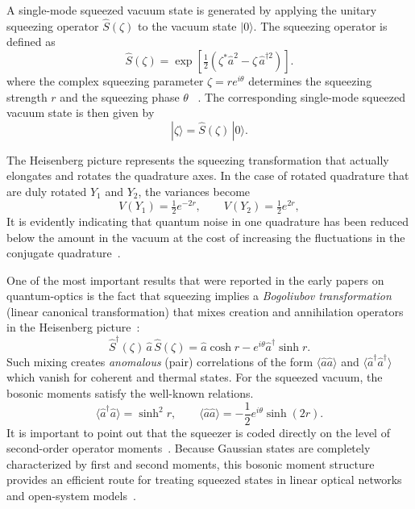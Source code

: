 A single-mode squeezed vacuum state is generated by applying the unitary
squeezing operator $\hat{S}(\zeta)$ to the vacuum state $|0\rangle$.
The squeezing operator is defined as
\begin{equation}
	\hat{S}(\zeta)
	= \exp\!\left[\tfrac{1}{2}\left(\zeta^{*}\hat{a}^{2}
	- \zeta\,\hat{a}^{\dagger 2}\right)\right].
\end{equation}
where the complex squeezing parameter $\zeta = r e^{i\theta}$ determines
the squeezing strength $r$ and the squeezing phase $\theta$
~\cite{Walls1983,AdessoRagyLee2014,WallsMilburn,Weedbrook2012}.
The corresponding single-mode squeezed vacuum state is then given by
\begin{equation}
	|\zeta\rangle = \hat{S}(\zeta)\,|0\rangle .
\end{equation}

The Heisenberg picture represents the squeezing transformation that actually elongates and rotates the quadrature axes. In the case of rotated quadrature that are duly rotated $Y_1$ and $Y_2$, the variances become
\[
V(Y_1)=\tfrac{1}{2}e^{-2r}, \qquad
V(Y_2)=\tfrac{1}{2}e^{2r},
\]
It is evidently indicating that quantum noise in one quadrature has been reduced below the amount in the vacuum at the cost of increasing the fluctuations in the conjugate quadrature~\cite{Walls1983}.


One of the most important results that were reported in the early papers on quantum-optics is the fact that squeezing implies a \emph{Bogoliubov transformation} (linear canonical transformation) that mixes creation and
annihilation operators in the Heisenberg picture~\cite{Walls1983}:
\begin{equation}
	\hat S^\dagger(\zeta)\,\hat a\,\hat S(\zeta)=
	\hat a\cosh r- e^{i\theta}\hat a^\dagger\sinh r.
	\label{eq:bogoliubov_singlemode}
\end{equation}
Such mixing creates \emph{anomalous} (pair) correlations of the form $\langle \hat a\hat a\rangle$ and
$\langle \hat a^\dagger\hat a^\dagger\rangle$ which vanish for coherent and thermal states.
For the squeezed vacuum, the bosonic moments satisfy the well-known relations.
\begin{equation}
	\langle \hat a^\dagger \hat a\rangle=\sinh^2 r,
	\qquad
	\langle \hat a \hat a\rangle=-\frac{1}{2}e^{i\theta}\sinh(2r).
\end{equation}
It is important to point out that the squeezer is coded directly on the level of second-order operator moments~\cite{Walls1983,Weedbrook2012}.
Because Gaussian states are completely characterized by first and second moments, this bosonic
moment structure provides an efficient route for treating squeezed states in linear optical
networks and open-system models~\cite{Weedbrook2012,AdessoRagyLee2014}.

